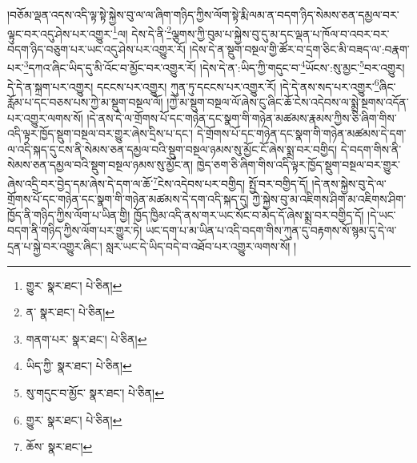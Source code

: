 །བཅོམ་ལྡན་འདས་འདི་ལྟ་སྟེ་སྐྱེས་བུ་ལ་ལ་ཞིག་གཉིད་ཀྱིས་ལོག་སྟེ་རྨི་ལམ་ན་བདག་ཉིད་སེམས་ཅན་དམྱལ་བར་ལྟུང་བར་འདུ་ཤེས་པར་འགྱུར་\footnote{གྱུར་  སྣར་ཐང་།  པེ་ཅིན། }ལ། དེས་དེ་ནི་\footnote{ན་  སྣར་ཐང་།  པེ་ཅིན། }ལྕགས་ཀྱི་བུམ་པ་སྐྱེས་བུ་དུ་མ་དང་ལྡན་པ་ཁོལ་བ་འབར་བར་བདག་ཉིད་བཅུག་པར་ཡང་འདུ་ཤེས་པར་འགྱུར་རོ། །དེས་དེ་ན་སྡུག་བསྔལ་གྱི་ཚོར་བ་དྲག་ཅིང་མི་བཟད་ལ་:བརྣག་པར་\footnote{གནག་པར་  སྣར་ཐང་།  པེ་ཅིན། }དཀའ་ཞིང་ཡིད་དུ་མི་འོང་བ་མྱོང་བར་འགྱུར་རོ། །དེས་དེ་ན་:ཡིད་ཀྱི་གདུང་བ་\footnote{ཡིད་ཀྱི་  སྣར་ཐང་།  པེ་ཅིན། }ཡོངས་:སུ་མྱང་\footnote{སུ་གདུང་བ་མྱོང་  སྣར་ཐང་།  པེ་ཅིན། }བར་འགྱུར། དེ་དེ་ན་སྐྲག་པར་འགྱུར། དངངས་པར་འགྱུར། ཀུན་ཏུ་དངངས་པར་འགྱུར་རོ། །དེ་དེ་ནས་སད་པར་འགྱུར་\footnote{གྱུར་  སྣར་ཐང་།  པེ་ཅིན། }ཞིང་རློམ་པ་དང་བཅས་པས་ཀྱེ་མ་སྡུག་བསྔལ་ལོ། །ཀྱེ་མ་སྡུག་བསྔལ་ལོ་ཞེས་ངུ་ཞིང་ཆོ་ངེས་འདེབས་ལ་སྨྲེ་སྔགས་འདོན་པར་འགྱུར་ལགས་སོ། །དེ་ནས་དེ་ལ་གྲོགས་པོ་དང་གཉེན་དང་སྣག་གི་གཉེན་མཚམས་རྣམས་ཀྱིས་ཅི་ཞིག་གིས་འདི་ལྟར་ཁྱོད་སྡུག་བསྔལ་བར་གྱུར་ཞེས་དྲིས་པ་དང་། དེ་གྲོགས་པོ་དང་གཉེན་དང་སྣག་གི་གཉེན་མཚམས་དེ་དག་ལ་འདི་སྐད་དུ་ངས་ནི་སེམས་ཅན་དམྱལ་བའི་སྡུག་བསྔལ་ཉམས་སུ་མྱོང་ངོ་ཞེས་སྨྲ་བར་བགྱིད། དེ་བདག་གིས་ནི་སེམས་ཅན་དམྱལ་བའི་སྡུག་བསྔལ་ཉམས་སུ་མྱོང་ན། ཁྱེད་ཅག་ཅི་ཞིག་གིས་འདི་ལྟར་ཁྱོད་སྡུག་བསྔལ་བར་གྱུར་ཞེས་འདྲི་བར་བྱེད་དམ་ཞེས་དེ་དག་ལ་ཆོ་\footnote{ཆོས་  སྣར་ཐང་། }ངེས་འདེབས་པར་བགྱིད། སྤྱོ་བར་བགྱིད་དོ། །དེ་ནས་སྐྱེས་བུ་དེ་ལ་གྲོགས་པོ་དང་གཉེན་དང་སྣག་གི་གཉེན་མཚམས་དེ་དག་འདི་སྐད་དུ། ཀྱེ་སྐྱེས་བུ་མ་འཇིགས་ཤིག་མ་འཇིགས་ཤིག་ཁྱོད་ནི་གཉིད་ཀྱིས་ལོག་པ་ཡིན་གྱི། ཁྱོད་ཁྱིམ་འདི་ནས་གར་ཡང་སོང་བ་མེད་དོ་ཞེས་སྨྲ་བར་བགྱིད་དོ། །དེ་ཡང་བདག་ནི་གཉིད་ཀྱིས་ལོག་པར་གྱུར་ཏེ། ཡང་དག་པ་མ་ཡིན་པ་འདི་བདག་གིས་ཀུན་དུ་བརྟགས་སོ་སྙམ་དུ་དེ་ལ་དྲན་པ་སྐྱེ་བར་འགྱུར་ཞིང་། སླར་ཡང་དེ་ཡིད་བདེ་བ་འཐོབ་པར་འགྱུར་ལགས་སོ། །
